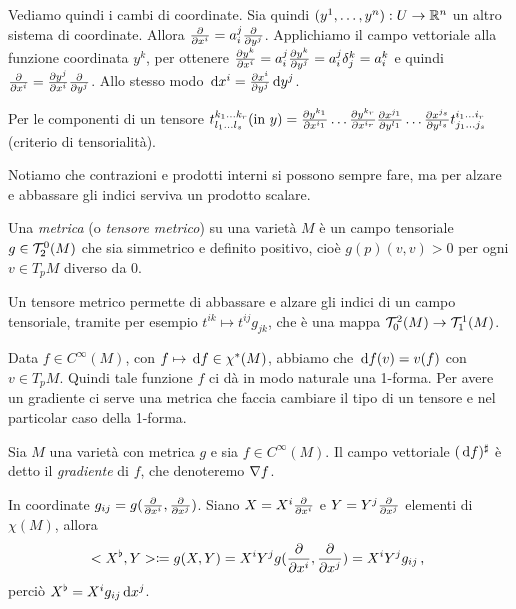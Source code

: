 Vediamo quindi i cambi di coordinate.
Sia quindi $(y^1,\ldots, y^n): U \to \mathbb R^n$ un altro sistema di coordinate. Allora $\frac{\partial }{\partial x^i} = a_i^j \frac{\partial }{\partial y^j}$. Applichiamo il campo vettoriale alla funzione coordinata $y^k$, per ottenere $\frac{\partial y^k}{\partial x^i} = a_i^j \frac{\partial y^k}{\partial y^j} = a_i^j \delta_j^k = a_i^k$ e quindi $\frac{\partial }{\partial x^i} = \frac{\partial y^j}{\partial x^i} \frac{\partial }{\partial y^j}$.
Allo stesso modo $\,\mathrm d x^i = \frac{\partial x^i}{\partial y^j} \,\mathrm d y^j$.

Per le componenti di un tensore $t_{l_1\ldots l_s}^{k_1\ldots k_r} (\text{in } y) = \frac{\partial y^{k_1}}{\partial x^{i_1}} \ldots \frac{\partial y^{k_r}}{\partial x^{i_r}} \frac{\partial x^{j_1}}{\partial y^{l_1}}\ldots \frac{\partial x^{j_s}}{\partial y^{l_s}} t_{j_1\ldots j_s}^{i_1\ldots i_r}$ (criterio di tensorialità).

Notiamo che contrazioni e prodotti interni si possono sempre fare, ma per alzare e abbassare gli indici serviva un prodotto scalare.

\begin{definition}  
	Una \emph{metrica} (o \emph{tensore metrico}) su una varietà $M$ è un campo tensoriale $g \in \mathcal T_2^0(M)$ che sia simmetrico e definito positivo, cioè $g(p)(v,v)>0$ per ogni $v\in T_pM$ diverso da 0.
\end{definition}

Un tensore metrico permette di abbassare e alzare gli indici di un campo tensoriale, tramite per esempio $t^{ik} \mapsto t^{ij}g_{jk}$, che è una mappa $\mathcal T_0^2(M) \to \mathcal T_1^1(M)$.

Data $f\in C^\infty(M)$, con $f \mapsto \,\mathrm d f \in \chi^*(M)$, abbiamo che $\,\mathrm d f(v) = v(f)$ con $v \in T_pM$. Quindi tale funzione $f$ ci dà in modo naturale una 1-forma.
Per avere un gradiente ci serve una metrica che faccia cambiare il tipo di un tensore e nel particolar caso della 1-forma.

\begin{definition}
	Sia $M$ una varietà con metrica $g$ e sia $f \in C^\infty(M)$. Il campo vettoriale $(\,\mathrm d f)^\sharp$ è detto il \emph{gradiente} di $f$, che denoteremo $\nabla f$. %
\end{definition}

In coordinate $g_{ij} = g(\frac{\partial }{\partial x^i}, \frac{\partial }{\partial x^j})$. Siano $X = X^i\frac{\partial }{\partial x^i}$ e $Y = Y^j\frac{\partial }{\partial x^j}$ elementi di $\chi(M)$, allora
\begin{equation*}
	<X^\flat, Y> \coloneqq g(X,Y) = X^iY^j g(\frac{\partial }{\partial x^i}, \frac{\partial }{\partial x^j}) = X^iY^j g_{ij} \, \text{, }
\end{equation*}
perciò $X^\flat = X^i g_{ij} \,\mathrm d x^j$.


